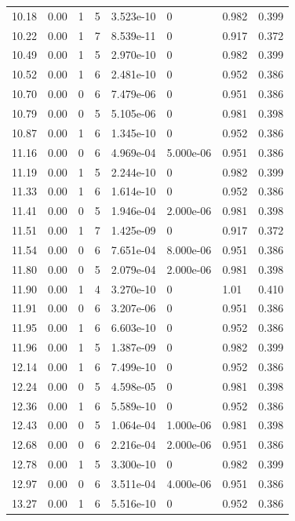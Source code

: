 \documentclass[preview]{standalone}
\begin{document}
{{{\begin{tabular}{L{1.2cm}C{1.2cm} C{0.3cm}C{0.5cm} C{1.4cm}C{1.4cm} C{1.4cm}C{1.4cm}}
  10.18  &  0.00  & 1     &  5 &  3.523e-10  & 0  & 0.982 &  0.399   \\ 
  10.22  &  0.00  & 1     &  7 &  8.539e-11  & 0  & 0.917 &  0.372   \\ 
  10.49  &  0.00  & 1     &  5 &  2.970e-10  & 0  & 0.982 &  0.399   \\ 
  10.52  &  0.00  & 1     &  6 &  2.481e-10  & 0  & 0.952 &  0.386   \\ 
  10.70  &  0.00  & 0     &  6 &  7.479e-06  & 0  & 0.951 &  0.386   \\ 
  10.79  &  0.00  & 0     &  5 &  5.105e-06  & 0  & 0.981 &  0.398   \\ 
  10.87  &  0.00  & 1     &  6 &  1.345e-10  & 0  & 0.952 &  0.386   \\ 
  11.16  &  0.00  & 0     &  6 &  4.969e-04  & 5.000e-06  & 0.951 &  0.386   \\ 
  11.19  &  0.00  & 1     &  5 &  2.244e-10  & 0  & 0.982 &  0.399   \\ 
  11.33  &  0.00  & 1     &  6 &  1.614e-10  & 0  & 0.952 &  0.386   \\ 
  11.41  &  0.00  & 0     &  5 &  1.946e-04  & 2.000e-06  & 0.981 &  0.398   \\ 
  11.51  &  0.00  & 1     &  7 &  1.425e-09  & 0  & 0.917 &  0.372   \\ 
  11.54  &  0.00  & 0     &  6 &  7.651e-04  & 8.000e-06  & 0.951 &  0.386   \\ 
  11.80  &  0.00  & 0     &  5 &  2.079e-04  & 2.000e-06  & 0.981 &  0.398   \\ 
  11.90  &  0.00  & 1     &  4 &  3.270e-10  & 0  & 1.01 &  0.410   \\ 
  11.91  &  0.00  & 0     &  6 &  3.207e-06  & 0  & 0.951 &  0.386   \\ 
  11.95  &  0.00  & 1     &  6 &  6.603e-10  & 0  & 0.952 &  0.386   \\ 
  11.96  &  0.00  & 1     &  5 &  1.387e-09  & 0  & 0.982 &  0.399   \\ 
  12.14  &  0.00  & 1     &  6 &  7.499e-10  & 0  & 0.952 &  0.386   \\ 
  12.24  &  0.00  & 0     &  5 &  4.598e-05  & 0  & 0.981 &  0.398   \\ 
  12.36  &  0.00  & 1     &  6 &  5.589e-10  & 0  & 0.952 &  0.386   \\ 
  12.43  &  0.00  & 0     &  5 &  1.064e-04  & 1.000e-06  & 0.981 &  0.398   \\ 
  12.68  &  0.00  & 0     &  6 &  2.216e-04  & 2.000e-06  & 0.951 &  0.386   \\ 
  12.78  &  0.00  & 1     &  5 &  3.300e-10  & 0  & 0.982 &  0.399   \\ 
  12.97  &  0.00  & 0     &  6 &  3.511e-04  & 4.000e-06  & 0.951 &  0.386   \\ 
  13.27  &  0.00  & 1     &  6 &  5.516e-10  & 0  & 0.952 &  0.386   \\ 
\hline 
\end{tabular} 

}}}
\end{document}
